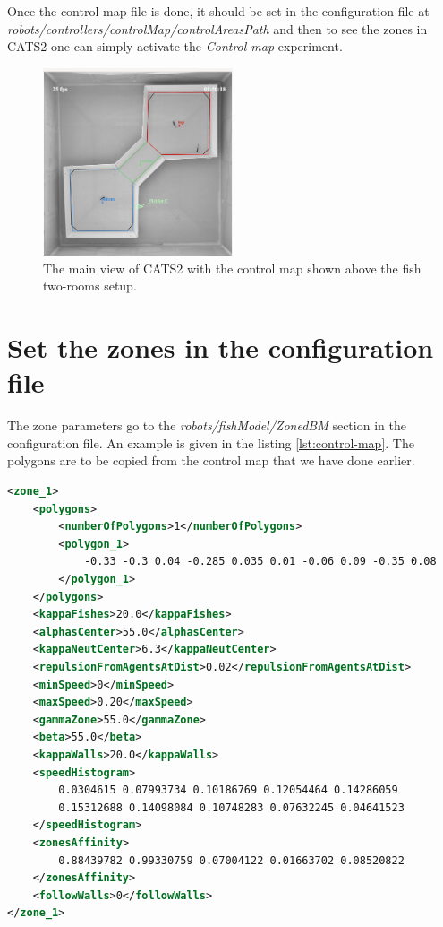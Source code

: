 \documentclass{styles/assisi}
\begin{document}
Once the control map file is done, it should be set in the configuration file at {\it robots/controllers/controlMap/controlAreasPath} and then to see the zones in CATS2 one can simply activate the {\it Control map} experiment. 

\begin{figure}[ht]
\centering
\includegraphics[width=0.5\textwidth]{./figs/control-map.png}
\caption{The main view of CATS2 with the control map shown above the fish two-rooms setup.}
\label{fig:control-map}
\end{figure}

\section{Set the zones in the configuration file}
The zone parameters go to the {\it robots/fishModel/ZonedBM} section in the configuration file. An example is given in the listing \ref{lst:control-map}.
The polygons are to be copied from the control map that we have done earlier.

\begin{lstlisting}[caption={Control map area example},label={lst:model},language=xml]
<zone_1>
    <polygons>
        <numberOfPolygons>1</numberOfPolygons>
        <polygon_1>
            -0.33 -0.3 0.04 -0.285 0.035 0.01 -0.06 0.09 -0.35 0.08
        </polygon_1>
    </polygons>
    <kappaFishes>20.0</kappaFishes>
    <alphasCenter>55.0</alphasCenter>
    <kappaNeutCenter>6.3</kappaNeutCenter>
    <repulsionFromAgentsAtDist>0.02</repulsionFromAgentsAtDist>
    <minSpeed>0</minSpeed>
    <maxSpeed>0.20</maxSpeed>
    <gammaZone>55.0</gammaZone>
    <beta>55.0</beta>
    <kappaWalls>20.0</kappaWalls>
    <speedHistogram>
        0.0304615 0.07993734 0.10186769 0.12054464 0.14286059
        0.15312688 0.14098084 0.10748283 0.07632245 0.04641523
    </speedHistogram>
    <zonesAffinity>
        0.88439782 0.99330759 0.07004122 0.01663702 0.08520822
    </zonesAffinity>
    <followWalls>0</followWalls>
</zone_1>
\end{lstlisting}
\end{document}
